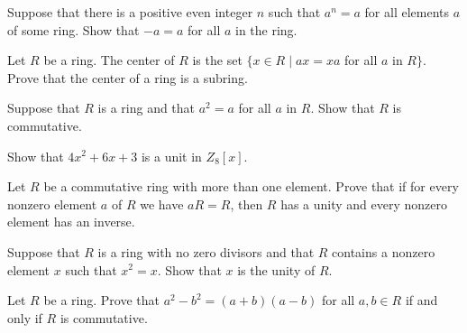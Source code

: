 \documentclass[
    11pt,a4paper,
]{exam}
\begin{document}
\begin{questions}
\question
Suppose that there is a positive even integer $n$ such that $a^n=a$ for all elements $a$ of some ring. Show that $-a=a$ for all $a$ in the ring.


\question
Let $R$ be a ring. The center of $R$ is the set $\{x \in R \mid a x=x a$ for all $a$ in $R\}$. Prove that the center of a ring is a subring.


\question
Suppose that $R$ is a ring and that $a^2=a$ for all $a$ in $R$. Show that $R$ is commutative.


\question 
Show that $4 x^2+6 x+3$ is a unit in $Z_8[x]$.


\question
Let $R$ be a commutative ring with more than one element. Prove that if for every nonzero element $a$ of $R$ we have $aR = R$, then $R$ has a unity and every nonzero element has an inverse.

\question
Suppose that \(R\) is a ring with no zero divisors and that \(R\) contains a nonzero element \(x\) such that \(x^2 = x\).
Show that \(x\) is the unity of \(R\).

\question
Let \(R\) be a ring.
Prove that \(a^2 - b^2 = (a+b)(a-b)\) for all \(a,b\in R\) if and only if \(R\) is commutative.
\end{questions}
\end{document}
